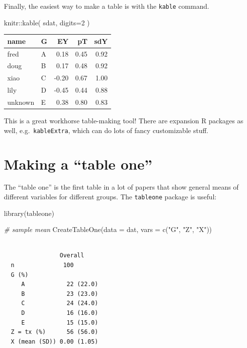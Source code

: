 \documentclass[
  letterpaper,
  DIV=11,
  numbers=noendperiod]{scrreprt}
\newenvironment{Shaded}{\begin{snugshade}}{\end{snugshade}}
\newcommand{\AttributeTok}[1]{\textcolor[rgb]{0.49,0.56,0.16}{#1}}
\newcommand{\CommentTok}[1]{\textcolor[rgb]{0.38,0.63,0.69}{\textit{#1}}}
\newcommand{\DecValTok}[1]{\textcolor[rgb]{0.25,0.63,0.44}{#1}}
\newcommand{\FunctionTok}[1]{\textcolor[rgb]{0.02,0.16,0.49}{#1}}
\newcommand{\NormalTok}[1]{\textcolor[rgb]{0.00,0.44,0.13}{#1}}
\newcommand{\SpecialCharTok}[1]{\textcolor[rgb]{0.25,0.44,0.63}{#1}}
\newcommand{\StringTok}[1]{\textcolor[rgb]{0.25,0.44,0.63}{#1}}
\begin{document}
Finally, the easiest way to make a table is with the \texttt{kable}
command.

\begin{Shaded}
\begin{Highlighting}[]
\NormalTok{knitr}\SpecialCharTok{::}\FunctionTok{kable}\NormalTok{( sdat, }\AttributeTok{digits=}\DecValTok{2}\NormalTok{ )}
\end{Highlighting}
\end{Shaded}

\begin{longtable}[]{@{}llrrr@{}}
\toprule\noalign{}
name & G & EY & pT & sdY \\
\midrule\noalign{}
\endhead
\bottomrule\noalign{}
\endlastfoot
fred & A & 0.18 & 0.45 & 0.92 \\
doug & B & 0.17 & 0.48 & 0.92 \\
xiao & C & -0.20 & 0.67 & 1.00 \\
lily & D & -0.45 & 0.44 & 0.88 \\
unknown & E & 0.38 & 0.80 & 0.83 \\
\end{longtable}

This is a great workhorse table-making tool! There are expansion R
packages as well, e.g.~\texttt{kableExtra}, which can do lots of fancy
customizable stuff.

\hypertarget{making-a-table-one}{%
\section{Making a ``table one''}\label{making-a-table-one}}

The ``table one'' is the first table in a lot of papers that show
general means of different variables for different groups. The
\texttt{tableone} package is useful:

\begin{Shaded}
\begin{Highlighting}[]
\FunctionTok{library}\NormalTok{(tableone)}

\CommentTok{\# sample mean  }
\FunctionTok{CreateTableOne}\NormalTok{(}\AttributeTok{data =}\NormalTok{ dat,}
               \AttributeTok{vars =} \FunctionTok{c}\NormalTok{(}\StringTok{"G"}\NormalTok{, }\StringTok{"Z"}\NormalTok{, }\StringTok{"X"}\NormalTok{))}
\end{Highlighting}
\end{Shaded}

\begin{verbatim}
               
                Overall     
  n              100        
  G (%)                     
     A            22 (22.0) 
     B            23 (23.0) 
     C            24 (24.0) 
     D            16 (16.0) 
     E            15 (15.0) 
  Z = tx (%)      56 (56.0) 
  X (mean (SD)) 0.00 (1.05) 
\end{verbatim}
\end{document}
